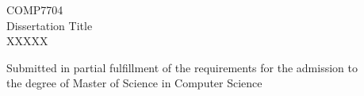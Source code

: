 \begin{titlepage}
\begin{center}

\vspace{30pt} %
\begin{center}
    {COMP7704}\\[10pt] %
    {Dissertation Title}\\ %
    {XXXXX}\\[20pt] %
\end{center}

\vspace{40pt} %


\begin{center}
    {Submitted in partial fulfillment of the requirements for the admission to\\
    the degree of Master of Science in Computer Science}\\[20pt]
\end{center}


\end{center}
\end{titlepage}
